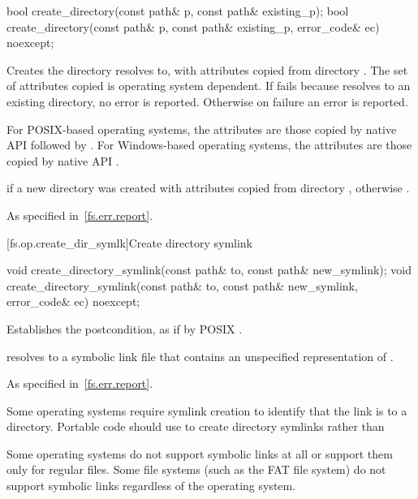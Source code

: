 %
\begin{itemdecl}
bool create_directory(const path& p, const path& existing_p);
bool create_directory(const path& p, const path& existing_p, error_code& ec) noexcept;
\end{itemdecl}

\begin{itemdescr}
\pnum
\effects Creates the
  directory  resolves to, with
  attributes copied from directory . The set of attributes
  copied is operating system dependent.
  If  fails because  resolves to an existing directory,
  no error is reported. Otherwise on failure an error is reported.
\begin{note} For POSIX-based operating systems, the
      attributes are those copied by native API 
      followed by . For
      Windows-based operating systems, the attributes are those copied by native
      API .
\end{note}

\pnum
\returns {} if a new directory was created
  with attributes copied from directory ,
  otherwise .

\pnum
\throws As specified in~\ref{fs.err.report}.
\end{itemdescr}


[fs.op.create_dir_symlk]{Create directory symlink}

%
\begin{itemdecl}
void create_directory_symlink(const path& to, const path& new_symlink);
void create_directory_symlink(const path& to, const path& new_symlink,
                              error_code& ec) noexcept;
\end{itemdecl}

\begin{itemdescr}
\pnum
\effects Establishes the postcondition, as if by POSIX .

\pnum
\ensures {} resolves to a symbolic link file that
  contains an unspecified representation of .

\pnum
\throws As specified in~\ref{fs.err.report}.

\pnum
\begin{note} Some operating systems require symlink creation to
  identify that the link is to a directory. Portable code should use  to create directory symlinks rather than  \end{note}

\pnum
\begin{note} Some operating systems do not support symbolic links at all or support
  them only for regular files.
  Some file systems (such as the FAT file system) do not
  support
  symbolic links regardless of the operating system. \end{note}
\end{itemdescr}

